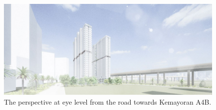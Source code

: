 \begin{figure}[H]
	\centering
	\includegraphics[width=0.9\linewidth]{src/graphics/kemayoran-a4b--design.jpg}
	\caption*{%
		The perspective at eye level from the road towards Kemayoran A4B.
	}
	\label{
		fig:kemayoran-a4b--design
	}
\end{figure}
